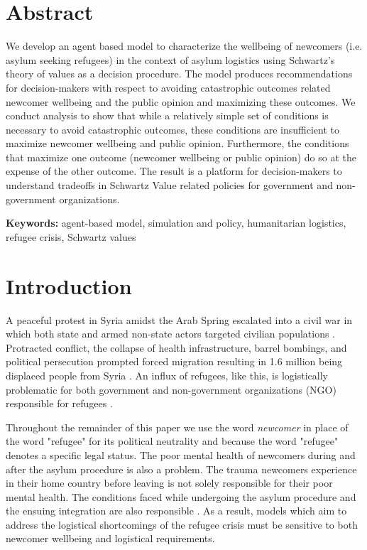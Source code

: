 \documentclass{scspaperproc}
\theoremstyle{scsthe}
\begin{document}
\maketitle

\section*{Abstract}

We develop an agent based model to characterize the wellbeing of newcomers (i.e. asylum seeking refugees) in the context of asylum logistics using Schwartz's theory of values as a decision procedure. The model produces recommendations for decision-makers with respect to avoiding catastrophic outcomes related newcomer wellbeing and the public opinion and maximizing these outcomes. We conduct analysis to show that while a relatively simple set of conditions is necessary to avoid catastrophic outcomes, these conditions are insufficient to maximize newcomer wellbeing and public opinion. Furthermore, the conditions that maximize one outcome (newcomer wellbeing or public opinion) do so at the expense of the other outcome. The result is a platform for decision-makers to understand tradeoffs in Schwartz Value related policies for government and non-government organizations.

\textbf{Keywords:} agent-based model, simulation and policy, humanitarian logistics, refugee crisis, Schwartz values

\section{Introduction}
\label{sec:intro}
A peaceful protest in Syria amidst the Arab Spring escalated into a civil war in which both state and armed non-state actors targeted civilian populations \cite{7}. Protracted conflict, the collapse of health infrastructure, barrel bombings, and political persecution prompted forced migration resulting in 1.6 million being displaced people from Syria \cite{26,42,90}. An influx of refugees, like this, is logistically problematic for both government and non-government organizations (NGO) responsible for refugees \cite{66}. 

Throughout the remainder of this paper we use the word \emph{newcomer} in place of the word "refugee" for its political neutrality and because the word "refugee" denotes a specific legal status. The poor mental health of newcomers during and after the asylum procedure is also a problem. The trauma newcomers experience in their home country before leaving is not solely responsible for their poor mental health. The conditions faced while undergoing the asylum procedure and the ensuing integration are also responsible \cite{68}. As a result, models which aim to address the logistical shortcomings of the refugee crisis must be sensitive to both newcomer wellbeing and logistical requirements.
\end{document}
